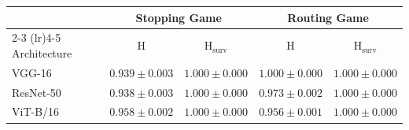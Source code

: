 \begin{tabular}{lcccc}
  \toprule
  & \multicolumn{2}{c}{Stopping Game} & \multicolumn{2}{c}{Routing Game} \\
  \cmidrule(lr){2-3} \cmidrule(lr){4-5}
  Architecture & $\mathrm{H}$ & $\mathrm{H}_{\mathrm{surv}}$ & $\mathrm{H}$ & $\mathrm{H}_{\mathrm{surv}}$ \\
  \midrule
    VGG-16 & $0.939 \pm 0.003$ & $1.000 \pm 0.000$ & $1.000 \pm 0.000$ & $1.000 \pm 0.000$ \\
    ResNet-50 & $0.938 \pm 0.003$ & $1.000 \pm 0.000$ & $0.973 \pm 0.002$ & $1.000 \pm 0.000$ \\
    ViT-B/16 & $0.958 \pm 0.002$ & $1.000 \pm 0.000$ & $0.956 \pm 0.001$ & $1.000 \pm 0.000$ \\
  \bottomrule
\end{tabular}
